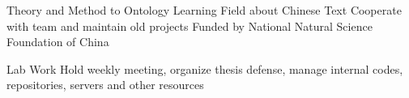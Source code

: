 {
}

{Theory and Method to Ontology Learning Field about Chinese Text}
{Cooperate with team and maintain old projects}
{Funded by National Natural Science Foundation of China}
{}
{
}

{Lab Work}
{Hold weekly meeting, organize thesis defense, manage internal codes,
repositories, servers and other resources}
{}
{}
{
}
